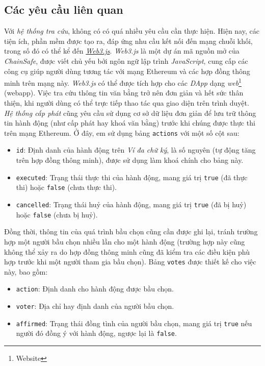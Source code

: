 \subsection{Các yêu cầu liên quan}
Với \textit{hệ thống tra cứu}, không có có quá nhiều yêu cầu cần thực hiện. Hiện nay, các tiện ích, phần mềm được tạo ra, đáp ứng nhu cầu kết nối đến mạng chuỗi khối, trong số đó có thể kể đến \href{https://github.com/ChainSafe/web3.js}{\textit{Web3.js}}. \textit{Web3.js} là một dự án mã nguồn mở của \textit{ChainSafe}, được viết chủ yếu bởi ngôn ngữ lập trình \textit{JavaScript}, cung cấp các công cụ giúp người dùng tương tác với mạng Ethereum và các hợp đồng thông minh trên mạng này. \textit{Web3.js} có thể được tích hợp cho các \textit{DApp} dạng \textit{web}\footnote{Website} (webapp). Việc tra cứu thông tin văn bằng trở nên đơn giản và hết sức thân thiện, khi người dùng có thể trực tiếp thao tác qua giao diện trên trình duyệt.\\

\textit{Hệ thống cấp phát} cũng yêu cầu sử dụng cơ sở dữ liệu đơn giản để lưu trữ thông tin hành động (như cấp phát hay khoá văn bằng) trước khi chúng được thực thi trên mạng Ethereum. Ở đây, em sử dụng bảng \texttt{actions} với một số cột sau:
\begin{itemize}
    \item \texttt{id}: Định danh của hành động trên \textit{Ví đa chữ ký}, là số nguyên (tự động tăng trên hợp đồng thông minh), được sử dụng làm khoá chính cho bảng này.
    \item \texttt{executed}: Trạng thái thực thi của hành động, mang giá trị \texttt{true} (đã thực thi) hoặc \texttt{false} (chưa thực thi).
    \item \texttt{cancelled}: Trạng thái huỷ của hành động, mang giá trị \texttt{true} (đã bị huỷ) hoặc \texttt{false} (chưa bị huỷ).
\end{itemize}

Đồng thời, thông tin của quá trình bầu chọn cũng cần được ghi lại, tránh trường hợp một người bầu chọn nhiều lần cho một hành động (trường hợp này cũng không thể xảy ra do hợp đồng thông minh cũng đã kiểm tra các điều kiện phù hợp trước khi một người tham gia bầu chọn). Bảng \texttt{votes} được thiết kế cho việc này, bao gồm:
\begin{itemize}
    \item \texttt{action}: Định danh cho hành động được bầu chọn.
    \item \texttt{voter}: Địa chỉ hay định danh của người bầu chọn.
    \item \texttt{affirmed}: Trạng thái đồng tình của người bầu chọn, mang giá trị \texttt{true} nếu người đó đồng ý với hành động, ngược lại là \texttt{false}.
\end{itemize}

